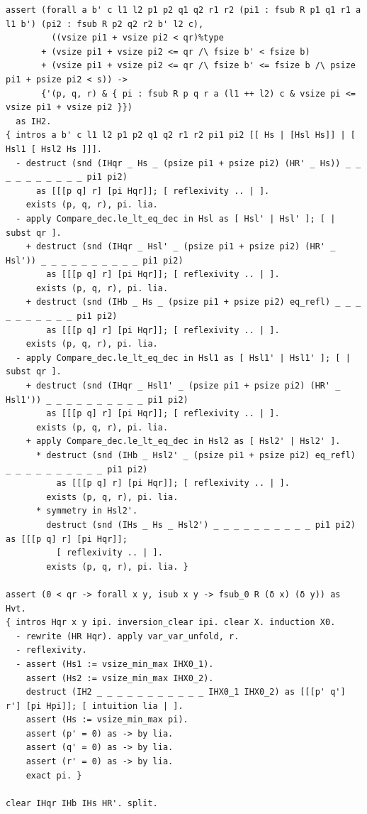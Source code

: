 \begin{lstlisting}
assert (forall a b' c l1 l2 p1 p2 q1 q2 r1 r2 (pi1 : fsub R p1 q1 r1 a l1 b') (pi2 : fsub R p2 q2 r2 b' l2 c),
         ((vsize pi1 + vsize pi2 < qr)%type
       + (vsize pi1 + vsize pi2 <= qr /\ fsize b' < fsize b)
       + (vsize pi1 + vsize pi2 <= qr /\ fsize b' <= fsize b /\ psize pi1 + psize pi2 < s)) ->
       {'(p, q, r) & { pi : fsub R p q r a (l1 ++ l2) c & vsize pi <= vsize pi1 + vsize pi2 }})
  as IH2.
{ intros a b' c l1 l2 p1 p2 q1 q2 r1 r2 pi1 pi2 [[ Hs | [Hsl Hs]] | [ Hsl1 [ Hsl2 Hs ]]].
  - destruct (snd (IHqr _ Hs _ (psize pi1 + psize pi2) (HR' _ Hs)) _ _ _ _ _ _ _ _ _ _ pi1 pi2)
      as [[[p q] r] [pi Hqr]]; [ reflexivity .. | ].
    exists (p, q, r), pi. lia.
  - apply Compare_dec.le_lt_eq_dec in Hsl as [ Hsl' | Hsl' ]; [ | subst qr ].
    + destruct (snd (IHqr _ Hsl' _ (psize pi1 + psize pi2) (HR' _ Hsl')) _ _ _ _ _ _ _ _ _ _ pi1 pi2)
        as [[[p q] r] [pi Hqr]]; [ reflexivity .. | ].
      exists (p, q, r), pi. lia.
    + destruct (snd (IHb _ Hs _ (psize pi1 + psize pi2) eq_refl) _ _ _ _ _ _ _ _ _ _ pi1 pi2)
        as [[[p q] r] [pi Hqr]]; [ reflexivity .. | ].
    exists (p, q, r), pi. lia.
  - apply Compare_dec.le_lt_eq_dec in Hsl1 as [ Hsl1' | Hsl1' ]; [ | subst qr ].
    + destruct (snd (IHqr _ Hsl1' _ (psize pi1 + psize pi2) (HR' _ Hsl1')) _ _ _ _ _ _ _ _ _ _ pi1 pi2)
        as [[[p q] r] [pi Hqr]]; [ reflexivity .. | ].
      exists (p, q, r), pi. lia.
    + apply Compare_dec.le_lt_eq_dec in Hsl2 as [ Hsl2' | Hsl2' ].
      * destruct (snd (IHb _ Hsl2' _ (psize pi1 + psize pi2) eq_refl) _ _ _ _ _ _ _ _ _ _ pi1 pi2)
          as [[[p q] r] [pi Hqr]]; [ reflexivity .. | ].
        exists (p, q, r), pi. lia.
      * symmetry in Hsl2'.
        destruct (snd (IHs _ Hs _ Hsl2') _ _ _ _ _ _ _ _ _ _ pi1 pi2) as [[[p q] r] [pi Hqr]];
          [ reflexivity .. | ].
        exists (p, q, r), pi. lia. }

assert (0 < qr -> forall x y, isub x y -> fsub_0 R (δ x) (δ y)) as Hvt.
{ intros Hqr x y ipi. inversion_clear ipi. clear X. induction X0.
  - rewrite (HR Hqr). apply var_var_unfold, r.
  - reflexivity.
  - assert (Hs1 := vsize_min_max IHX0_1).
    assert (Hs2 := vsize_min_max IHX0_2).
    destruct (IH2 _ _ _ _ _ _ _ _ _ _ _ IHX0_1 IHX0_2) as [[[p' q'] r'] [pi Hpi]]; [ intuition lia | ].
    assert (Hs := vsize_min_max pi).
    assert (p' = 0) as -> by lia.
    assert (q' = 0) as -> by lia.
    assert (r' = 0) as -> by lia.
    exact pi. }

clear IHqr IHb IHs HR'. split.


\end{lstlisting}
